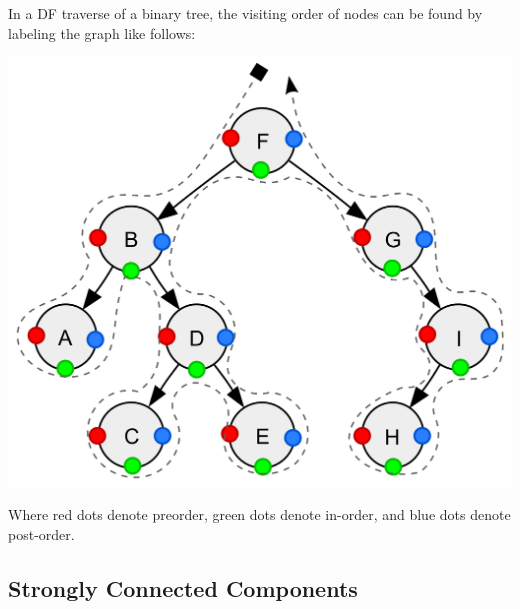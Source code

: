 \begin{remark}
	In a DF traverse of a binary tree, the visiting order of nodes can be found by labeling the graph like follows: \\
	\begin{center}
		\includegraphics[scale=0.2]{images/dfs_order.png} \\
	\end{center}
	Where red dots denote preorder, green dots denote in-order, and blue dots denote post-order.
\end{remark}

\subsection{Strongly Connected Components}